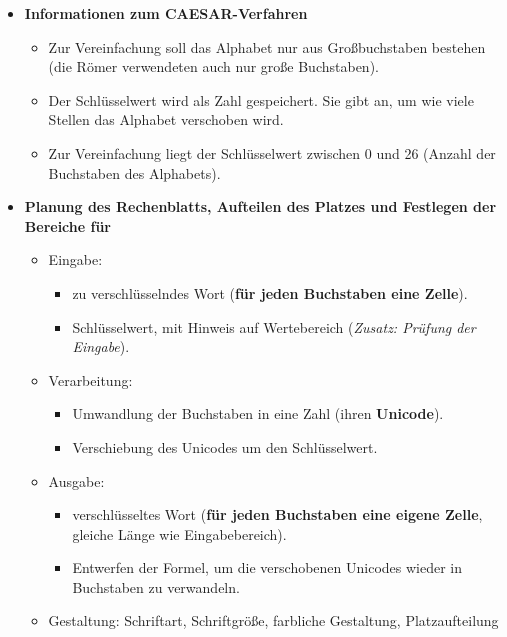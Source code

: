 \documentclass[10pt, a4paper]{scrartcl}
\begin{document}
\begin{itemize}
	\item \textbf{Informationen zum CAESAR-Verfahren}
	\begin{itemize}
		\item Zur Vereinfachung soll das Alphabet nur aus Großbuchstaben bestehen (die Römer verwendeten auch nur große Buchstaben).
		\item Der Schlüsselwert wird als Zahl gespeichert. Sie gibt an, um wie viele Stellen das Alphabet verschoben wird.
		\item Zur Vereinfachung liegt der Schlüsselwert zwischen 0 und 26 (Anzahl der Buchstaben des Alphabets).
	\end{itemize}
	\item \textbf{Planung des Rechenblatts, Aufteilen des Platzes und Festlegen der Bereiche für}
	\begin{itemize}
		\item Eingabe:
		\begin{itemize}
			\item zu verschlüsselndes Wort (\textbf{für jeden Buchstaben eine Zelle}).
			\item Schlüsselwert, mit Hinweis auf Wertebereich (\textit{Zusatz: Prüfung der Eingabe}).
		\end{itemize}
		\item Verarbeitung:
		\begin{itemize}
			\item Umwandlung der Buchstaben in eine Zahl (ihren \textbf{Unicode}).
			\item Verschiebung des Unicodes um den Schlüsselwert.
		\end{itemize}
		\item Ausgabe:
		\begin{itemize}
			\item verschlüsseltes Wort (\textbf{für jeden Buchstaben eine eigene Zelle}, gleiche Länge wie Eingabebereich).
			\item Entwerfen der Formel, um die verschobenen Unicodes wieder in Buchstaben zu verwandeln.
		\end{itemize}
		\item Gestaltung: Schriftart, Schriftgröße, farbliche Gestaltung, Platzaufteilung
	\end{itemize}
\end{itemize}

\clearpage
\end{document}
